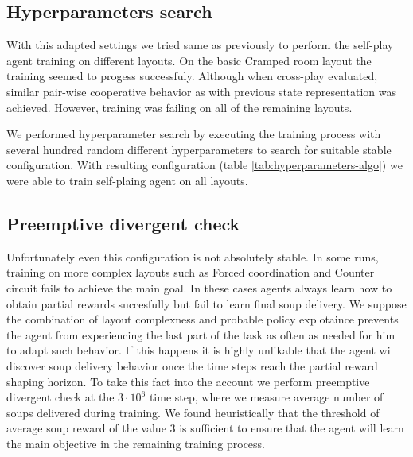 \subsection*{Hyperparameters search}
With this adapted settings we tried same as previously to perform the self-play agent training on different layouts.
On the basic Cramped room layout the training seemed to progess successfuly.
Although when cross-play evaluated, similar pair-wise cooperative behavior as with previous state representation was achieved.
However, training was failing on all of the remaining layouts.

We performed hyperparameter search by executing the training process with several hundred random different hyperparameters to search for suitable stable configuration.
With resulting configuration (table \ref{tab:hyperparameters-algo}) we were able to train self-plaing agent on all layouts.

\subsection*{Preemptive divergent check}
Unfortunately even this configuration is not absolutely stable.
In some runs, training on more complex layouts such as Forced coordination and Counter circuit fails to achieve the main goal.
In these cases agents always learn how to obtain partial rewards succesfully but fail to learn final soup delivery.
We suppose the combination of layout complexness and probable policy explotaince prevents the agent from experiencing the last part of the task as often as needed for him to adapt such behavior.
If this happens it is highly unlikable that the agent will discover soup delivery behavior once the time steps reach the partial reward shaping horizon.
To take this fact into the account we perform preemptive divergent check at the $3\cdot10^6$ time step, where we measure average number of soups delivered during training.
We found heuristically that the threshold of average soup reward of the value $3$ is sufficient to ensure that the agent will learn the main objective in the remaining training process.


